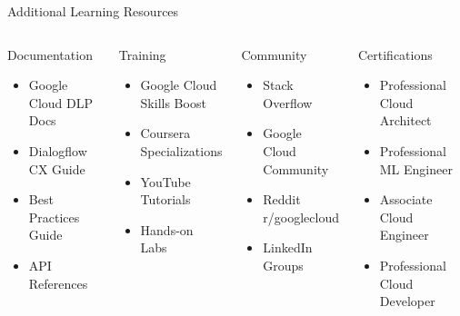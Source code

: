 \documentclass[aspectratio=169]{beamer}
\begin{document}
\begin{frame}{Additional Learning Resources}
    \begin{columns}
        \begin{block}{\textcolor{googleblue}{\faBook} Documentation}
            \begin{itemize}
                \item Google Cloud DLP Docs
                \item Dialogflow CX Guide
                \item Best Practices Guide
                \item API References
            \end{itemize}
        \end{block}
        
        \begin{block}{\textcolor{googlegreen}{\faGraduationCap} Training}
            \begin{itemize}
                \item Google Cloud Skills Boost
                \item Coursera Specializations
                \item YouTube Tutorials
                \item Hands-on Labs
            \end{itemize}
        \end{block}
        
        \begin{block}{\textcolor{googleyellow}{\faUsers} Community}
            \begin{itemize}
                \item Stack Overflow
                \item Google Cloud Community
                \item Reddit r/googlecloud
                \item LinkedIn Groups
            \end{itemize}
        \end{block}
        
        \begin{block}{\textcolor{googlered}{\faCertificate} Certifications}
            \begin{itemize}
                \item Professional Cloud Architect
                \item Professional ML Engineer
                \item Associate Cloud Engineer
                \item Professional Cloud Developer
            \end{itemize}
        \end{block}
    \end{columns}
\end{frame}
\end{document}
